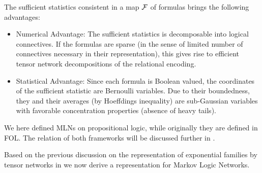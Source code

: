 The sufficient statistics consistent in a map $\mathcal{F}$ of formulas brings the following advantages:
\begin{itemize}
	\item Numerical Advantage: The sufficient statistics is decomposable into logical connectives. 
	If the formulas are sparse (in the sense of limited number of connectives necessary in their representation), this gives rise to efficient tensor network decompositions of the relational encoding.
	\item Statistical Advantage: Since each formula is Boolean valued, the coordinates of the sufficient statistic are Bernoulli variables. 
	Due to their boundedness, they and their averages (by Hoeffdings inequality) are sub-Gaussian variables with favorable concentration properties (absence of heavy tails).
\end{itemize}

\begin{remark}
	We here defined MLNs on propositional logic, while originally they are defined in FOL.
	The relation of both frameworks will be discussed further in .
\end{remark}




Based on the previous discussion on the representation of exponential families by tensor networks in  we now derive a representation for Markov Logic Networks.


